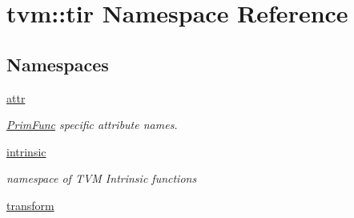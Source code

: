 \hypertarget{namespacetvm_1_1tir}{}\section{tvm\+:\+:tir Namespace Reference}
\label{namespacetvm_1_1tir}
\subsection*{Namespaces}
\begin{DoxyCompactItemize}
\item 
 \hyperlink{namespacetvm_1_1tir_1_1attr}{attr}
\begin{DoxyCompactList}\small\item\em \hyperlink{classtvm_1_1tir_1_1PrimFunc}{Prim\+Func} specific attribute names. \end{DoxyCompactList}\item 
 \hyperlink{namespacetvm_1_1tir_1_1intrinsic}{intrinsic}
\begin{DoxyCompactList}\small\item\em namespace of T\+VM Intrinsic functions \end{DoxyCompactList}\item 
 \hyperlink{namespacetvm_1_1tir_1_1transform}{transform}
\end{DoxyCompactItemize}

